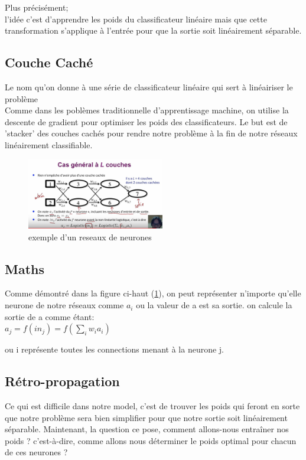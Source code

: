 \documentclass[oneside]{book}
\begin{document}
Plus précisément;\\
l'idée c'est d'apprendre les poids du classificateur linéaire mais que cette transformation s'applique à l'entrée pour que la sortie soit linéairement séparable.\\

\subsection{Couche Caché}
Le nom qu'on donne à une série de classificateur linéaire qui sert à linéairiser le problème\\

Comme dans les poblèmes traditionnelle d'apprentissage machine, on utilise la descente de gradient pour optimiser les poids des classificateurs. Le but est de 'stacker' des couches cachés pour rendre notre problème à la fin de notre réseaux linéairement classifiable.\\

\begin{figure}[!ht]
\centering
\includegraphics[width = 6cm]{reseaux_neurone.png}
\caption{exemple d'un reseaux de neurones}
\label{fig:Exemple_Reseaux_Neurones}
\end{figure}

\subsection{Maths}
Comme démontré dans la figure ci-haut (\ref{fig:Exemple_Reseaux_Neurones}), on peut représenter n'importe qu'elle neurone de notre réseaux comme $a_i$ ou la valeur de a est sa sortie. on calcule la sortie de a comme étant:\\

\centering
$a_j = f(in_j) = f(\sum\limits_i w_i a_i)$\\
\justify

ou i représente toutes les connections menant à la neurone j.\\

\subsection{Rétro-propagation}
Ce qui est difficile dans notre model, c'est de trouver les poids qui feront en sorte que notre problème sera bien simplifier pour que notre sortie soit linéairement séparable. Maintenant, la question ce pose, comment allons-nous entraîner nos poids ? c'est-à-dire, comme allons nous déterminer le poids optimal pour chacun de ces neurones ?\\
\end{document}
